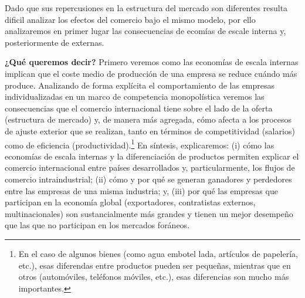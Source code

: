 \documentclass[10pt,a4paper]{article}
\begin{document}
Dado que sus repercusiones en la estructura del mercado son diferentes resulta dificil analizar los efectos del comercio bajo el mismo modelo, por ello analizaremos en primer lugar las consecuencias de ecomías de escale interna y, posteriormente de externas.

\textbf{¿Qué queremos decir?} Primero veremos como las economías de escala internas implican que el coste medio de producción de una empresa se reduce cuándo más produce. Analizando de forma explícita el comportamiento de las empresas individualizadas en un marco de competencia monopolística veremos las consecuencias que el comercio internacional tiene sobre el lado de la oferta (estructura de mercado) y, de manera más agregada, cómo afecta a los procesos de ajuste exterior que se realizan, tanto en términos de competitividad (salarios) como de eficiencia (productividad).\footnote{%
    En el caso de algunos bienes (como agua embotel lada, artículos de papelería, etc.), esas diferendas entre productos pueden ser pequeñas, mientras que en otros (automóviles, teléfonos móviles, etc.), esas diferencias son mucho más importantes.
} En síntesis, explicaremos: (i) cómo las economías de escala internas y la diferenciación de productos permiten explicar el comercio internacional entre países desarrollados y, particularmente, los flujos de comercio intraindustrial; (ii) cómo y por qué se generan ganadores y perdedores entre las empresas de una misma industria; y, (iii) por qué las empresas que participan en la economía global (exportadores, contratistas externos, multinacionales) son sustancialmente más grandes y tienen un mejor desempeño que las que no participan en los mercados foráneos.
\end{document}
